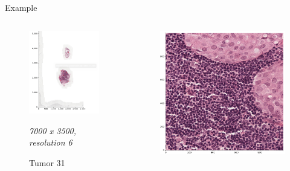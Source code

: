 \documentclass{beamer}
\begin{document}
\begin{frame}{Example}
\begin{columns}[T] %
\begin{column}{.3\textwidth}
\begin{figure}[!ht]
\centering
\includegraphics[width=\textwidth]{Tumor_31.png}
\caption{Tumor 31}
\textit{7000 x 3500, resolution 6}
\label{}
\end{figure}
\end{column}%
\hfill%
\begin{column}{.3\textwidth}
\begin{figure}[!ht]
\centering
\includegraphics[width=\textwidth]{Tumor_31_res0.png}

\end{figure}
\end{column}
\end{columns}
\end{frame}
\end{document}

